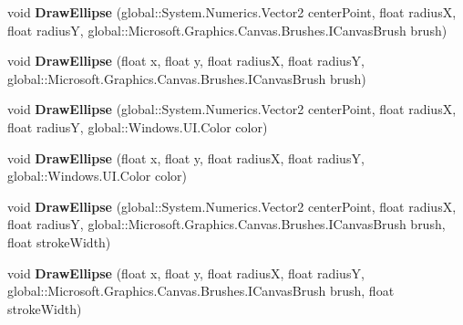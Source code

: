 \begin{DoxyCompactItemize}
void {\bfseries Draw\+Ellipse} (global\+::\+System.\+Numerics.\+Vector2 center\+Point, float radiusX, float radiusY, global\+::\+Microsoft.\+Graphics.\+Canvas.\+Brushes.\+I\+Canvas\+Brush brush)
\item 
\mbox{\label{class_microsoft_1_1_graphics_1_1_canvas_1_1_canvas_drawing_session_a6e9c150ed00b003555ff6a9cd5ccbdc2}} 
void {\bfseries Draw\+Ellipse} (float x, float y, float radiusX, float radiusY, global\+::\+Microsoft.\+Graphics.\+Canvas.\+Brushes.\+I\+Canvas\+Brush brush)
\item 
\mbox{\label{class_microsoft_1_1_graphics_1_1_canvas_1_1_canvas_drawing_session_a6defe04021c4bbef0f3b5437dc2db4e3}} 
void {\bfseries Draw\+Ellipse} (global\+::\+System.\+Numerics.\+Vector2 center\+Point, float radiusX, float radiusY, global\+::\+Windows.\+U\+I.\+Color color)
\item 
\mbox{\label{class_microsoft_1_1_graphics_1_1_canvas_1_1_canvas_drawing_session_a5993baa57c0ba821debd8e2fb78bae21}} 
void {\bfseries Draw\+Ellipse} (float x, float y, float radiusX, float radiusY, global\+::\+Windows.\+U\+I.\+Color color)
\item 
\mbox{\label{class_microsoft_1_1_graphics_1_1_canvas_1_1_canvas_drawing_session_aaf3284a99b7cf00f111c35c5e11a889b}} 
void {\bfseries Draw\+Ellipse} (global\+::\+System.\+Numerics.\+Vector2 center\+Point, float radiusX, float radiusY, global\+::\+Microsoft.\+Graphics.\+Canvas.\+Brushes.\+I\+Canvas\+Brush brush, float stroke\+Width)
\item 
\mbox{\label{class_microsoft_1_1_graphics_1_1_canvas_1_1_canvas_drawing_session_aa13437c0721acd2270fcea212b03b8f7}} 
void {\bfseries Draw\+Ellipse} (float x, float y, float radiusX, float radiusY, global\+::\+Microsoft.\+Graphics.\+Canvas.\+Brushes.\+I\+Canvas\+Brush brush, float stroke\+Width)
\item 
\mbox{\label{class_microsoft_1_1_graphics_1_1_canvas_1_1_canvas_drawing_session_a5a91d792553d1fc1f81c18d11b313cf3}} 

\end{DoxyCompactItemize}
